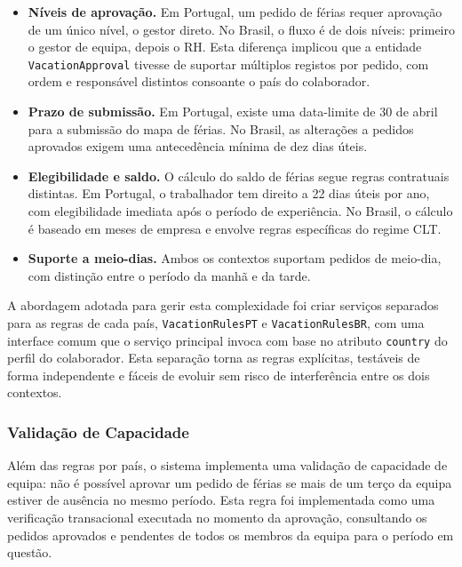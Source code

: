 \documentclass[12pt, a4paper, twoside, openright]{report}
\begin{document}
\begin{itemize}
  \item \textbf{Níveis de aprovação.} Em Portugal, um pedido de férias requer aprovação
        de um único nível, o gestor direto. No Brasil, o fluxo é de dois níveis:
        primeiro o gestor de equipa, depois o RH. Esta diferença implicou que a
        entidade \texttt{VacationApproval} tivesse de suportar múltiplos registos
        por pedido, com ordem e responsável distintos consoante o país do colaborador.

  \item \textbf{Prazo de submissão.} Em Portugal, existe uma data-limite de 30 de abril
        para a submissão do mapa de férias. No Brasil, as alterações a pedidos aprovados
        exigem uma antecedência mínima de dez dias úteis.

  \item \textbf{Elegibilidade e saldo.} O cálculo do saldo de férias segue regras
        contratuais distintas. Em Portugal, o trabalhador tem direito a 22 dias úteis
        por ano, com elegibilidade imediata após o período de experiência. No Brasil,
        o cálculo é baseado em meses de empresa e envolve regras específicas do regime CLT.

  \item \textbf{Suporte a meio-dias.} Ambos os contextos suportam pedidos de meio-dia,
        com distinção entre o período da manhã e da tarde.
\end{itemize}

A abordagem adotada para gerir esta complexidade foi criar serviços separados para
as regras de cada país, \texttt{VacationRulesPT} e \texttt{VacationRulesBR},
com uma interface comum que o serviço principal invoca com base no atributo
\texttt{country} do perfil do colaborador. Esta separação torna as regras explícitas,
testáveis de forma independente e fáceis de evoluir sem risco de interferência
entre os dois contextos.

\subsubsection{Validação de Capacidade}

Além das regras por país, o sistema implementa uma validação de capacidade de equipa:
não é possível aprovar um pedido de férias se mais de um terço da equipa estiver de
ausência no mesmo período. Esta regra foi implementada como uma verificação transacional
executada no momento da aprovação, consultando os pedidos aprovados e pendentes
de todos os membros da equipa para o período em questão.
\end{document}
